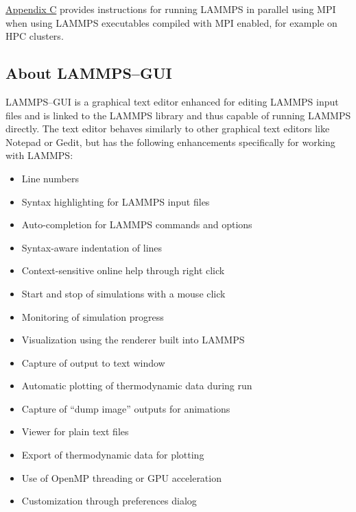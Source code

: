 \documentclass[9pt,tutorial]{livecoms}
\begin{document}
\hyperref[parallel-lammps-label]{Appendix C} provides instructions for running
LAMMPS in parallel using MPI when using LAMMPS executables compiled
with MPI enabled, for example on HPC clusters.

%

\subsection{About LAMMPS--GUI}

LAMMPS--GUI is a graphical text editor enhanced for editing LAMMPS input
files and is linked to the LAMMPS library and thus capable of running
LAMMPS directly.  The text editor behaves similarly to other graphical
text editors like Notepad or Gedit, but has the following enhancements
specifically for working with LAMMPS:
\begin{itemize}
\item Line numbers
\item Syntax highlighting for LAMMPS input files
\item Auto-completion for LAMMPS commands and options
\item Syntax-aware indentation of lines
\item Context-sensitive online help through right click
\item Start and stop of simulations with a mouse click
\item Monitoring of simulation progress
\item Visualization using the renderer built into LAMMPS
\item Capture of output to text window
\item Automatic plotting of thermodynamic data during run
\item Capture of ``dump image'' outputs for animations
\item Viewer for plain text files
\item Export of thermodynamic data for plotting
\item Use of OpenMP threading or GPU acceleration
\item Customization through preferences dialog
\end{itemize}
\end{document}
